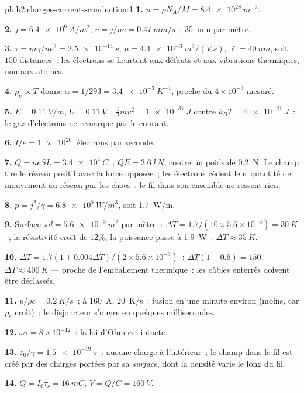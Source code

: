 \begin{solution}{pb:b2:charges-currents-conduction:1}
\textbf{1.} $n = \rho N_A/M = \qty{8.4e28}{m^{-3}}$.

\textbf{2.} $j = \qty{6.4e6}{A/m^2}$, $v = j/ne = \qty{0.47}{mm/s}$~; \qty{35}{min} par mètre.

\textbf{3.} $\tau = m\gamma/ne^2 = \qty{2.5e-14}{s}$, $\mu = \qty{4.4e-3}{m^2/(V.s)}$, $\ell =
\qty{40}{nm}$, soit $150$ distances~: les électrons se heurtent aux défauts et aux
vibrations thermiques, non aux atomes.

\textbf{4.} $\rho_e \propto T$ donne $\alpha = 1/293 = \qty{3.4e-3}{K^{-1}}$, proche du
$4 \times 10^{-3}$ mesuré.

\textbf{5.} $E = \qty{0.11}{V/m}$, $U = \qty{0.11}{V}$~; $\tfrac12mv^2 = \qty{1e-37}{J}$ contre
$k_BT = \qty{4e-21}{J}$~: le gaz d'électrons ne remarque pas le courant.

\textbf{6.} $I/e = \qty{1e20}{}$ électrons par seconde.

\textbf{7.} $Q = neSL = \qty{3.4e4}{C}$~; $QE = \qty{3.6}{kN}$, contre un poids de
\qty{0.2}{N}. Le champ tire le réseau positif avec la force opposée~;
les électrons cèdent leur quantité de mouvement au réseau par les chocs~:
le fil dans son ensemble ne ressent rien.

\textbf{8.} $p = j^2/\gamma = \qty{6.8e5}{W/m^3}$, soit \qty{1.7}{W/m}.

\textbf{9.} Surface $\pi d = \qty{5.6e-3}{m^2}$ par mètre~: $\Delta T = 1.7/(10 \times 5.6 \times
10^{-3}) = \qty{30}{K}$~; la résistivité croît de $12\%$, la puissance passe à \qty{1.9}{W}~:
$\Delta T \approx \qty{35}{K}$.

\textbf{10.} $\Delta T = 1.7(1 + 0.004\Delta T)/(2 \times 5.6 \times 10^{-3})$~: $\Delta T(1 - 0.6) = 150$,
$\Delta T \approx \qty{400}{K}$ --- proche de l'emballement thermique~: les câbles enterrés doivent être
déclassés.

\textbf{11.} $p/\rho c = \qty{0.2}{K/s}$~; à \qty{160}{A}, \qty{20}{K/s}~: fusion en
une minute environ (moins, car $\rho_e$ croît)~; le disjoncteur s'ouvre en quelques millisecondes.

\textbf{12.} $\omega\tau = 8 \times 10^{-12}$~: la loi d'Ohm est intacte.

\textbf{13.} $\varepsilon_0/\gamma = \qty{1.5e-19}{s}$~: aucune charge à l'intérieur~; le champ dans le
fil est créé par des charges portées par sa \emph{surface}, dont la densité varie
le long du fil.

\textbf{14.} $Q = I_0\tau_c = \qty{16}{mC}$, $V = Q/C = \qty{160}{V}$.


\end{solution}
